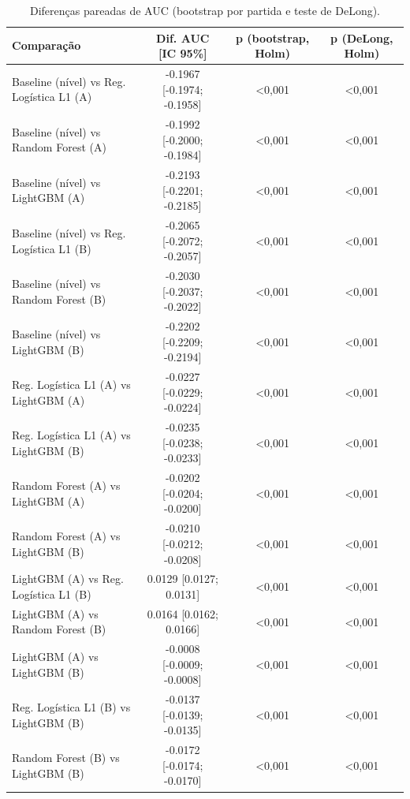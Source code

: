\begin{table}[htbp]
\caption{Diferenças pareadas de AUC (bootstrap por partida e teste de DeLong).}
\label{tab:comparacoes}
\centering
\small
\begin{tabular}{lccc}
\toprule
Comparação & Dif. AUC [IC 95\%] & p (bootstrap, Holm) & p (DeLong, Holm) \\
\midrule
Baseline (nível) vs Reg. Logística L1 (A) & -0.1967 [-0.1974; -0.1958] & <0,001 & <0,001 \\
Baseline (nível) vs Random Forest (A) & -0.1992 [-0.2000; -0.1984] & <0,001 & <0,001 \\
Baseline (nível) vs LightGBM (A) & -0.2193 [-0.2201; -0.2185] & <0,001 & <0,001 \\
Baseline (nível) vs Reg. Logística L1 (B) & -0.2065 [-0.2072; -0.2057] & <0,001 & <0,001 \\
Baseline (nível) vs Random Forest (B) & -0.2030 [-0.2037; -0.2022] & <0,001 & <0,001 \\
Baseline (nível) vs LightGBM (B) & -0.2202 [-0.2209; -0.2194] & <0,001 & <0,001 \\
Reg. Logística L1 (A) vs LightGBM (A) & -0.0227 [-0.0229; -0.0224] & <0,001 & <0,001 \\
Reg. Logística L1 (A) vs LightGBM (B) & -0.0235 [-0.0238; -0.0233] & <0,001 & <0,001 \\
Random Forest (A) vs LightGBM (A) & -0.0202 [-0.0204; -0.0200] & <0,001 & <0,001 \\
Random Forest (A) vs LightGBM (B) & -0.0210 [-0.0212; -0.0208] & <0,001 & <0,001 \\
LightGBM (A) vs Reg. Logística L1 (B) & 0.0129 [0.0127; 0.0131] & <0,001 & <0,001 \\
LightGBM (A) vs Random Forest (B) & 0.0164 [0.0162; 0.0166] & <0,001 & <0,001 \\
LightGBM (A) vs LightGBM (B) & -0.0008 [-0.0009; -0.0008] & <0,001 & <0,001 \\
Reg. Logística L1 (B) vs LightGBM (B) & -0.0137 [-0.0139; -0.0135] & <0,001 & <0,001 \\
Random Forest (B) vs LightGBM (B) & -0.0172 [-0.0174; -0.0170] & <0,001 & <0,001 \\
\bottomrule
\end{tabular}
\end{table}
